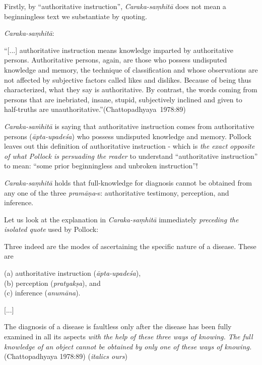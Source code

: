 Firstly, by ``authoritative instruction'', {{\sl Caraka-saṃhitā}\relax} does not mean a beginningless text we substantiate by quoting.

{\sl Caraka-saṃhitā}:
\begin{myquote}
``[...] authoritative instruction means knowledge imparted by authoritative persons. Authoritative persons, again, are those who possess undisputed knowledge and memory, the technique of classification and whose observations are not affected by subjective factors called likes and dislikes. Because of being thus characterized, what they say is authoritative.  By contrast, the words coming from persons that are inebriated, insane, stupid, subjectively inclined and given to half-truths are unauthoritative.''\hfill \hbox{(Chattopadhyaya 1978:89)}
\end{myquote}

{\sl Caraka-saṁhitā} is saying that authoritative instruction comes from authoritative persons ({\sl āpta-upadeśa}) who possess undisputed knowledge and memory. Pollock leaves out this definition of authoritative instruction - which is {\sl the exact opposite of what Pollock is persuading the reader} to understand ``authoritative instruction'' to mean: ``some prior beginningless and unbroken instruction''!

{\sl Caraka-saṃhitā} holds that full-knowledge for diagnosis cannot be obtained from any one of the three {\sl pramāṇa}-s: authoritative testimony, perception, and inference.

Let us look at the explanation in {\sl Caraka-saṃhitā} immediately {\sl preceding the isolated quote} used by Pollock:
\begin{myquote}
Three indeed are the modes of ascertaining the specific nature of a disease. These are 

(a) authoritative instruction ({\sl āpta-upadeśa}),\\ 
(b) perception ({\sl pratyakṣa}), and\\ 
(c) inference ({\sl anumāna}).

[...]

The diagnosis of a disease is faultless only after the disease has been fully examined in all its aspects {\sl with the help of these three ways of knowing. The full knowledge of an object cannot be obtained by only one of these ways of knowing.}\hfill (Chattopadhyaya 1978:89) ({\sl italics ours})
\end{myquote}

